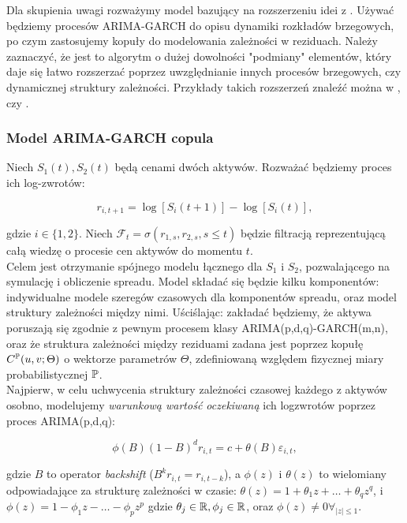 Dla skupienia uwagi rozważymy model bazujący na rozszerzeniu idei z \cite{Herath_Copula_Crack_Spread}. Używać będziemy procesów ARIMA-GARCH do opisu dynamiki rozkładów brzegowych, po czym zastosujemy kopuły do modelowania zależności w reziduach. Należy zaznaczyć, że jest to algorytm o dużej dowolności "podmiany" elementów, który daje się łatwo rozszerzać poprzez uwzględnianie innych procesów brzegowych, czy dynamicznej struktury zależności. Przykłady takich rozszerzeń znaleźć można w \cite{Espen_Crack_Spread_Copula}, \cite{Bernard_Pricing_Multivariate_Options_with_copulae} czy \cite{Cherubini_Dynamic_Copula_Methods_in_Finance}.\\

\subsubsection{Model ARIMA-GARCH copula}
Niech $S_1(t), S_2(t)$ będą cenami dwóch aktywów. Rozważać będziemy proces ich log-zwrotów:

$$ r_{i, t+1} = \log[S_i(t+1)] - \log[S_i(t)],$$

gdzie $i\in\{1,2\}$. Niech $\mathcal{F}_t = \sigma(r_{1,s}, r_{2,s}, s\leqslant t)$ będzie filtracją reprezentującą całą wiedzę o procesie cen aktywów do momentu $t$.\\

Celem jest otrzymanie spójnego modelu łącznego dla $S_1$ i $S_2$, pozwalającego na symulację i obliczenie spreadu. Model składać się będzie kilku komponentów: indywidualne modele szeregów czasowych dla komponentów spreadu, oraz model struktury zależności między nimi. Uściślając: zakładać będziemy, że aktywa poruszają się zgodnie z pewnym procesem klasy ARIMA(p,d,q)-GARCH(m,n), oraz że struktura zależności między reziduami zadana jest poprzez kopułę $C^{\mathbb{P}}(u, v; \Theta)$ o wektorze parametrów $\Theta$, zdefiniowaną względem fizycznej miary probabilistycznej $\mathbb{P}$.\\

Najpierw, w celu uchwycenia struktury zależności czasowej każdego z aktywów osobno, modelujemy \emph{warunkową wartość oczekiwaną} ich logzwrotów poprzez proces ARIMA(p,d,q):

\begin{equation}
	\phi(B)(1-B)^d r_{i, t} = c + \theta(B)\varepsilon_{i, t},
	\label{eq:arima_part}
\end{equation}

gdzie $B$ to operator \emph{backshift} ($B^kr_{i, t} = r_{i, t-k}$), a $\phi(z)$ i $\theta(z)$ to wielomiany odpowiadające za strukturę zależności w czasie: $\theta(z) = 1 + \theta_1z + \dots + \theta_qz^q$, i $\phi(z) = 1 - \phi_1z - \dots - \phi_pz^p$ gdzie $\theta_j\in\mathbb{R}, \phi_j\in\mathbb{R}$, oraz $\phi(z) \not=0 \forall_{\vert z \vert \leqslant 1}$.

